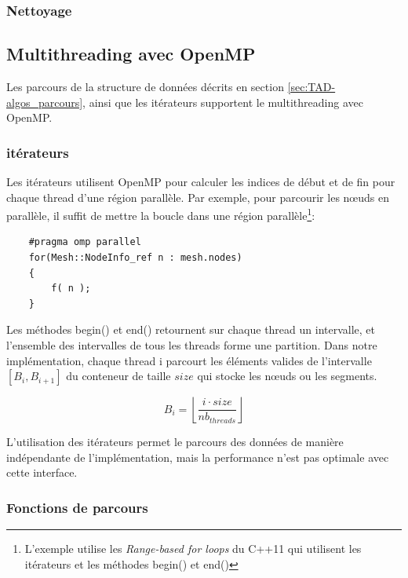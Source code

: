 \subsubsection{Nettoyage}



\subsection{Multithreading avec OpenMP}

Les parcours de la structure de données décrits en section \ref{sec:TAD-algos_parcours}, ainsi que les itérateurs supportent le multithreading avec OpenMP. 

\subsubsection{itérateurs}

Les itérateurs utilisent OpenMP pour calculer les indices de début et de fin pour chaque thread d'une région parallèle. Par exemple, pour parcourir les nœuds en parallèle, il suffit de mettre la boucle dans une région parallèle\footnote{L'exemple utilise les \textit{Range-based for loops} du C++11 qui utilisent les itérateurs et les méthodes begin() et end()}:

\begin{verbatim}
    #pragma omp parallel
    for(Mesh::NodeInfo_ref n : mesh.nodes)
    {
        f( n );
    }
\end{verbatim}

Les méthodes begin() et end() retournent sur chaque thread un intervalle, et l'ensemble des intervalles de tous les threads forme une partition. Dans notre implémentation, chaque thread i parcourt les éléments valides de l'intervalle $[B_i, B_{i+1}]$ du conteneur de taille $size$ qui stocke les nœuds ou les segments.

\begin{equation}
    B_i = \left \lfloor{\frac{i \cdot size}{nb_{threads}}}\right \rfloor 
\end{equation}

L'utilisation des itérateurs permet le parcours des données de manière indépendante de l'implémentation, mais la performance n'est pas optimale avec cette interface.

\subsubsection{Fonctions de parcours}

